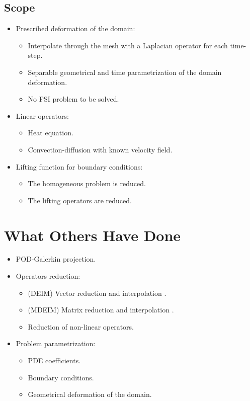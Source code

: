\documentclass[../main.tex]{subfiles}
\begin{document}
\subsection{Scope}
\begin{itemize}
    \item Prescribed deformation of the domain:
    \begin{itemize}
        \item Interpolate through the mesh with a Laplacian operator for each time-step.
        \item Separable geometrical and time parametrization of the domain deformation.
        \item No FSI problem to be solved.
    \end{itemize}
    \item Linear operators:
    \begin{itemize}
        \item Heat equation.
        \item Convection-diffusion with known velocity field. 
    \end{itemize}
    \item Lifting function for boundary conditions:
    \begin{itemize}
        \item The homogeneous problem is reduced.
        \item The lifting operators are reduced. 
    \end{itemize}
\end{itemize}
\section{What Others Have Done}
\begin{itemize}
    \item POD-Galerkin projection.
    \item Operators reduction:
    \begin{itemize}
        \item (DEIM) Vector reduction and interpolation \cite{2010_nonlinearModelReductionDeim_chaturantabut}.
        \item (MDEIM) Matrix reduction and interpolation \cite{2015_efficientModelReductionParametrizedSystemsMatrixDeim_Negri}.
        \item Reduction of non-linear operators.
    \end{itemize}
    \item Problem parametrization: 
    \begin{itemize}
        \item PDE coefficients.
        \item Boundary conditions.
        \item Geometrical deformation of the domain.
    \end{itemize}
\end{itemize}
\end{document}
